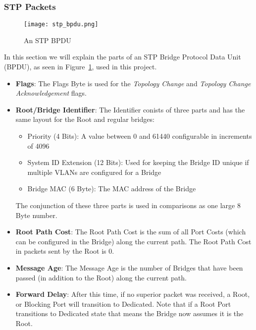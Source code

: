 \subsubsection{STP Packets}
\label{stp_packet}
\begin{figure}[h]
    \centering
    \texttt{[image: stp\_bpdu.png]}
    \caption{An STP BPDU}
    \label{fig:stp_bpdu}
\end{figure}
In this section we will explain the parts of an STP Bridge Protocol Data Unit (BPDU), as seen in Figure~\ref{fig:stp_bpdu}, used in this project.
\begin{itemize}
    \item \textbf{Flags}: The Flags Byte is used for the \textit{Topology Change} and \textit{Topology Change Acknowledgement} flags.
    \item \textbf{Root/Bridge Identifier}: The Identifier conists of three parts and has the same layout for the Root and regular bridges:
        \begin{itemize}
            \item Priority (4 Bits): A value between 0 and 61440 configurable in increments of 4096
            \item System ID Extension (12 Bits): Used for keeping the Bridge ID unique if multiple VLANs are configured for a Bridge
            \item Bridge MAC (6 Byte): The MAC address of the Bridge
        \end{itemize}
        The conjunction of these three parts is used in comparisons as one large 8 Byte number.
    \item \textbf{Root Path Cost}: The Root Path Cost is the sum of all Port Costs (which can be configured in the Bridge) along the current path. The Root Path Cost in packets sent by the Root is 0.
    \item \textbf{Message Age}: The Message Age is the number of Bridges that have been passed (in addition to the Root) along the current path.
    \item \textbf{Forward Delay}: After this time, if no superior packet was received, a Root, or Blocking Port will transition to Dedicated.
        Note that if a Root Port transitions to Dedicated state that means the Bridge now assumes it is the Root.
\end{itemize}
